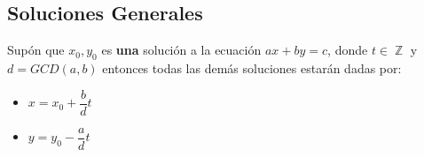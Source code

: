 \documentclass[12pt, fleqn]{report}                             %
\DeclareMathOperator \Integers  {\mathbb{Z}}                     %
\begin{document}
        \subsection{Soluciones Generales}

            Supón que $x_0, y_0$ es \textbf{una} solución a la ecuación $ax+ by = c$,
            donde $t \in \Integers$ y $d=GCD(a,b)$ entonces todas las demás soluciones
            estarán dadas por:

            \begin{itemize}
                \item $x = x_0 + \dfrac{b}{d}t$
                \item $y = y_0 - \dfrac{a}{d}t$
            \end{itemize}


\end{document}
